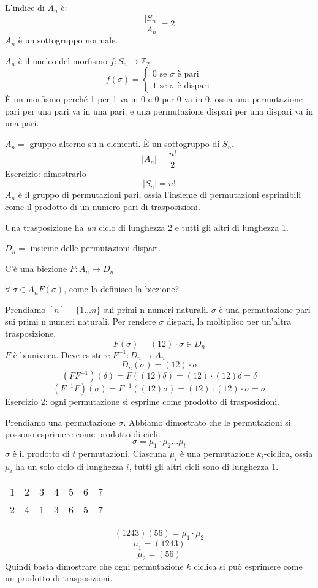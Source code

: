 L'indice di $A_n$ \`e:
\[
\frac{|S_n|}{A_n} = 2
\]
$A_n$ \`e un sottogruppo normale.

$A_n$ \`e il nucleo del morfismo $f : S_n \to \mathbb{Z}_2$:
\[
f (\sigma) = 
\begin{cases}
0 \text{ se } \sigma \text{ \`e pari} \\
1 \text{ se } \sigma \text{ \`e dispari} 
\end{cases}
\]
\`E un morfismo perch\'e 1 per 1 va in 0 e 0 per 0 va in 0, ossia una permutazione pari per una pari va in una pari, e una permutazione dispari per una dispari va in una pari.


$A_n =$ gruppo alterno su n elementi. \`E un sottogruppo di $S_n$.
\[
|A_n| = \frac{n!}{2}
\]
Esercizio: dimostrarlo
\[
|S_n| = n!
\]
$A_n$ \`e il gruppo di permutazioni pari, ossia l'insieme di permutazioni esprimibili come il prodotto di un numero pari di trasposizioni.

Una trasposizione ha \textit{un} ciclo di lunghezza 2 e tutti gli altri di lunghezza 1.

$D_n =$ insieme delle permutazioni dispari.

C'\`e una biezione $F : A_n \to D_n$

$\forall \ \sigma \in A_n F(\sigma)$, come la definisco la biezione?

Prendiamo $[n] - \{ 1 \dots n \}$ sui primi n numeri naturali. $\sigma$ \`e una permutazione pari sui primi n numeri naturali. Per rendere $\sigma$ dispari, la moltiplico per un'altra trasposizione.
\[
F(\sigma) = (1 2) \cdot \sigma \in D_n
\]
$F$ \`e biunivoca. Deve esistere $F^{-1} : D_n \to A_n$
\[
D_n(\sigma) = (1 2) \cdot \sigma
\]
\[
(F F^{-1}) (\delta) = F((1 2) \delta) = (1 2) \cdot (1 2) \delta = \delta
\]
\[
(F^{-1} F) (\sigma) = F^{-1}((1 2) \sigma) = (1 2) \cdot (1 2) \cdot \sigma = \sigma
\]
Esercizio 2: ogni permutazione si esprime come prodotto di trasposizioni.

Prendiamo una permutazione $\sigma$. Abbiamo dimostrato che le permutazioni si possono esprimere come prodotto di cicli.
\[
\sigma = \mu_1 \cdot \mu_2 \dots \mu_t
\]
$\sigma$ \`e il prodotto di $t$ permutazioni. Ciascuna $\mu_i$ \`e una permutazione $k_i$-ciclica, ossia $\mu_i$ ha un solo ciclo di lunghezza $i$, tutti gli altri cicli sono di lunghezza 1.

\begin{tabular}{*{7}{c}}
1 & 2 & 3 & 4 & 5 & 6 & 7 \\
2 & 4 & 1 & 3 & 6 & 5 & 7
\end{tabular}
\[
(1 2 4 3) (5 6) = \mu_1 \cdot \mu_2
\]
\[
\mu_1 = (1 2 4 3)
\]
\[
\mu_2 = (5 6)
\]
Quindi basta dimostrare che ogni permutazione $k$ ciclica si pu\`o esprimere come un prodotto di trasposizioni.

